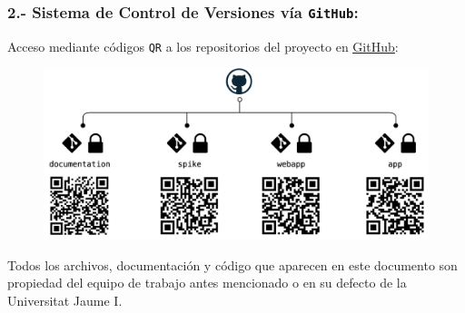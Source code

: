 \documentclass[11pt]{article}
\begin{document}
	\subsubsection*{2.- Sistema de Control de Versiones vía \texttt{GitHub}:}
	Acceso mediante códigos \texttt{QR} a los repositorios del proyecto en \href{https://github.com/proyecto-new}{\underline{GitHub}}:

		\begin{figure}[H]
			\begin{center}
			\includegraphics[scale=0.16]{images/githubdessign.png}
			\end{center}
		\end{figure}

\vfill
\vspace*{\fill}
\hrulefill
\vfill

\vspace{5mm}
\noindent
Todos los archivos, documentación y código que aparecen en este documento son propiedad del equipo de trabajo antes mencionado o en su defecto de la Universitat Jaume I.\\


	\vspace*{\fill}
	\hrulefill
	\doclicenseThis
	\newpage
	\setcounter{page}{1}


\newpage 
\setcounter{page}{1}
\pagestyle{plain}
\tableofcontents	%
\newpage
\listoffigures		%
\vspace*{\fill}
\lstlistoflistings	%
\vspace*{\fill}
\newpage
\listoftables		%



\newpage
\setcounter{page}{1}

\pagestyle{fancy}
\fancyhead[LE,LO]{}





	
\newpage

	
\newpage


\newpage


\newpage


\newpage



\newpage

\end{document}
